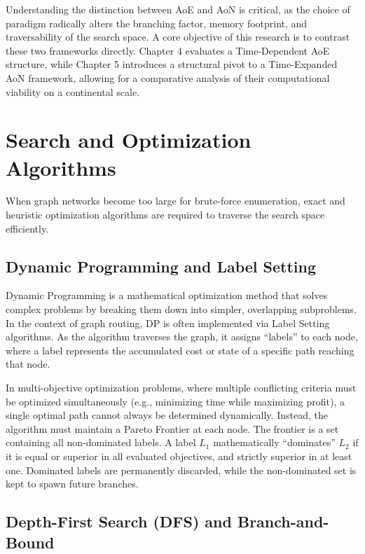 \medskip

Understanding the distinction between AoE and AoN is critical, as the choice of paradigm radically alters the branching factor, memory footprint, and traversability of the search space. A core objective of this research is to contrast these two frameworks directly. Chapter 4 evaluates a Time-Dependent AoE structure, while Chapter 5 introduces a structural pivot to a Time-Expanded AoN framework, allowing for a comparative analysis of their computational viability on a continental scale.

\section{Search and Optimization Algorithms}
\label{sec:search_algorithms}

When graph networks become too large for brute-force enumeration, exact and heuristic optimization algorithms are required to traverse the search space efficiently.

\subsection{Dynamic Programming and Label Setting}
\label{subsec:dp_label_setting}

Dynamic Programming is a mathematical optimization method that solves complex problems by breaking them down into simpler, overlapping subproblems. In the context of graph routing, DP is often implemented via Label Setting algorithms. As the algorithm traverses the graph, it assigns ``labels'' to each node, where a label represents the accumulated cost or state of a specific path reaching that node.

In multi-objective optimization problems, where multiple conflicting criteria must be optimized simultaneously (e.g., minimizing time while maximizing profit), a single optimal path cannot always be determined dynamically. Instead, the algorithm must maintain a Pareto Frontier at each node. The frontier is a set containing all non-dominated labels. A label $L_1$ mathematically ``dominates'' $L_2$ if it is equal or superior in all evaluated objectives, and strictly superior in at least one. Dominated labels are permanently discarded, while the non-dominated set is kept to spawn future branches.

\subsection{Depth-First Search (DFS) and Branch-and-Bound}
\label{subsec:dfs_bnb}

